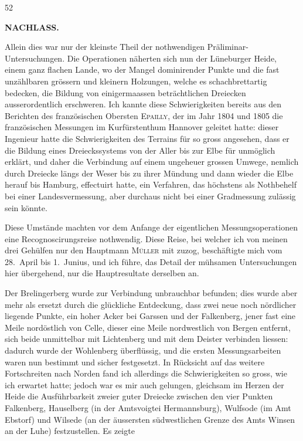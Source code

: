 \par\smallskip
\noindent\hspace*{.030\linewidth}{\footnotesize IX.}\hfill{\small 52}\hspace*{.137\linewidth}\par
\clearpage

\noindent{}\hfill{\small\textbf{NACHLASS.}}\hfill\null\par\medskip
\par\noindent\hspace*{\parindent}Allein dies war nur der kleinste Theil der nothwendigen Präliminar-Untersuchungen.
Die Operationen näherten sich nun der Lüneburger Heide,
einem ganz flachen Lande, wo der Mangel dominirender Punkte und die fast
unzählbaren grössern und kleinern Holzungen, welche es schachbrettartig bedecken,
die Bildung von einigermaassen beträchtlichen Dreiecken ausserordentlich
erschweren. Ich kannte diese Schwierigkeiten bereits aus den Berichten
des französischen Obersten \textsc{Epailly}, der im Jahr 1804 und 1805 die französischen
Messungen im Kurfürstenthum Hannover geleitet hatte: dieser Ingenieur
hatte die Schwierigkeiten des Terrains für so gross angesehen, dass er
die Bildung eines Dreieckssystems von der Aller bis zur Elbe für unmöglich
erklärt, und daher die Verbindung auf einem ungeheuer grossen Umwege,
nemlich durch Dreiecke längs der Weser bis zu ihrer Mündung und dann
wieder die Elbe herauf bis Hamburg, effectuirt hatte, ein Verfahren, das
höchstens als Nothbehelf bei einer Landesvermessung, aber durchaus nicht
bei einer Gradmessung zulässig sein könnte.

\par\noindent\hspace*{\parindent}Diese Umstände machten vor dem Anfange der eigentlichen Messungsoperationen
eine Recognoscirungsreise nothwendig. Diese Reise, bei welcher
ich von meinen drei Gehülfen nur den Hauptmann \textsc{Müller} mit zuzog,
beschäftigte mich vom 28.~April bis 1.~Junius, und ich führe, das Detail der
mühsamen Untersuchungen hier übergehend, nur die Hauptresultate derselben
an.

\par\noindent\hspace*{\parindent}Der Brelingerberg wurde zur Verbindung unbrauchbar befunden; dies
wurde aber mehr als ersetzt durch die glückliche Entdeckung, dass zwei neue
noch nördlicher liegende Punkte, ein hoher Acker bei Garssen und der Falkenberg,
jener fast eine Meile nordöstlich von Celle, dieser eine Meile nordwestlich
von Bergen entfernt, sich beide unmittelbar mit Lichtenberg und mit dem
Deister verbinden liessen: dadurch wurde der Wohlenberg überflüssig, und die
ersten Messungsarbeiten waren nun bestimmt und sicher festgesetzt. In Rücksicht
auf das weitere Fortschreiten nach Norden fand ich allerdings die
Schwierigkeiten so gross, wie ich erwartet hatte; jedoch war es mir auch gelungen,
gleichsam im Herzen der Heide die Ausführbarkeit zweier guter Dreiecke
zwischen den vier Punkten Falkenberg, Hauselberg (in der Amtsvoigtei
Hermannsburg), Wulfsode (im Amt Ebstorf) und Wilsede (an der äussersten
südwestlichen Grenze des Amts Winsen an der Luhe) festzustellen. Es zeigte
